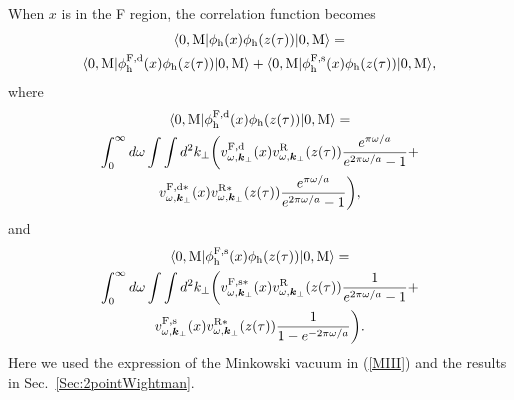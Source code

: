 \documentclass[aps,prd,preprintnumbers,nofootinbib,showpacs,11pt]{revtex4}%
\begin{document}
\begin{widetext}
When $x$ is in the F region, the correlation function becomes
\begin{multline}
\langle0,{\rm M}| \phi_{\rm h}(x) \phi_{\rm h}(z(\tau))|0,{\rm M}\rangle=\\
\langle0,{\rm M}| \phi_{\rm h}^{\rm F,d}(x) \phi_{\rm h}(z(\tau))|0,{\rm M}\rangle+
\langle0,{\rm M}| \phi_{\rm h}^{\rm F,s}(x) \phi_{\rm h}(z(\tau))|0,{\rm M}\rangle,
\end{multline}
where 
\begin{multline}
\langle0,{\rm M}| \phi_{\rm h}^{\rm F,d}(x) \phi_{\rm h}(z(\tau))|0,{\rm M}\rangle =\\
\int_0^{\infty}d\omega\int\int d^2k_\perp\biggl(
v_{\omega,\bm k_\perp}^{\rm F,d}(x)v_{\omega,\bm k_\perp}^{\rm R}(z(\tau))
{e^{\pi\omega/a}\over e^{2\pi\omega/a}-1}
+\\
v_{\omega,\bm k_\perp}^{\rm F,d*}(x)v_{\omega,\bm k_\perp}^{\rm R*}(z(\tau))
{e^{\pi\omega/a}\over e^{2\pi\omega/a}-1}\biggr),
\label{MppM1}
\end{multline}
\noindent
and
\begin{multline}
\langle0,{\rm M}| \phi_{\rm h}^{\rm F,s}(x) \phi_{\rm h}(z(\tau))|0,{\rm M}\rangle =\\
\int_0^{\infty}d\omega\int\int d^2k_\perp\biggl(
v_{\omega,\bm k_\perp}^{\rm  F,s*}(x)v_{\omega,\bm k_\perp}^{\rm R}(z(\tau))
{1\over e^{2\pi\omega/a}-1}
+\\
v_{\omega,\bm k_\perp}^{\rm F,s}(x)v_{\omega,\bm k_\perp}^{\rm R*}(z(\tau))
{1\over 1-e^{-2\pi\omega/a}}
\biggr) .
\label{MppM2}
\end{multline}
Here we used the expression of the Minkowski vacuum in (\ref{MIII}) and 
the results in Sec.~\ref{Sec:2pointWightman}.


\end{widetext}
\end{document}
